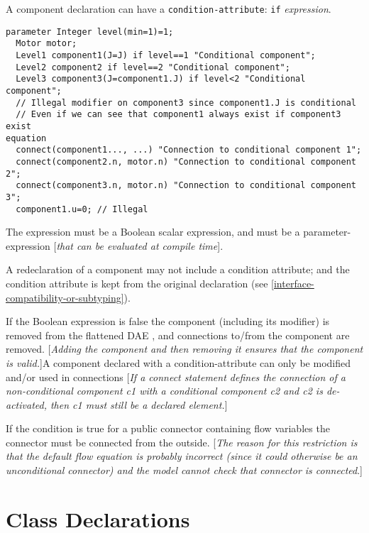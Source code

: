A component declaration can have a \lstinline!condition-attribute!: \lstinline!if!
\emph{expression}.

\begin{example}
\begin{lstlisting}[language=modelica]
  parameter Integer level(min=1)=1;
  Motor motor;
  Level1 component1(J=J) if level==1 "Conditional component";
  Level2 component2 if level==2 "Conditional component";
  Level3 component3(J=component1.J) if level<2 "Conditional component";
  // Illegal modifier on component3 since component1.J is conditional
  // Even if we can see that component1 always exist if component3 exist
equation
  connect(component1..., ...) "Connection to conditional component 1";
  connect(component2.n, motor.n) "Connection to conditional component 2";
  connect(component3.n, motor.n) "Connection to conditional component 3";
  component1.u=0; // Illegal
\end{lstlisting}
\end{example}

The expression must be a Boolean scalar expression, and must be a
parameter-expression {[}\emph{that can be evaluated at compile time}{]}.

A redeclaration of a component may not include a condition attribute;
and the condition attribute is kept from the original declaration (see
\autoref{interface-compatibility-or-subtyping}).

If the Boolean expression is false the component (including its
modifier) is removed from the flattened DAE , and connections to/from
the component are removed. {[}\emph{Adding the component and then removing it ensures that
the component is valid.}{]}A component declared with a
condition-attribute can only be modified and/or used in connections
{[}\emph{If a connect statement defines the connection of a
non-conditional component c1 with a conditional component c2 and c2 is
de-activated, then c1 must still be a declared element.}{]}

If the condition is true for a public connector containing flow
variables the connector must be connected from the outside. {[}\emph{The
reason for this restriction is that the default flow equation is
probably incorrect (since it could otherwise be an unconditional
connector) and the model cannot check that connector is connected}.{]}

\section{Class Declarations}

